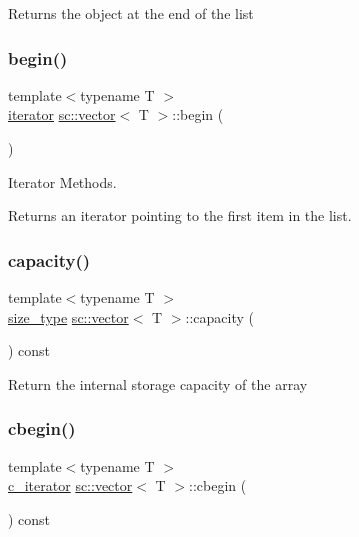 Returns the object at the end of the list \mbox{\label{classsc_1_1vector_aefba74791ea0f1ab9b9ad95d35bf9497}} 
\subsubsection{\texorpdfstring{begin()}{begin()}}
{\footnotesize\ttfamily template$<$typename T $>$ \\
\hyperlink{classsc_1_1vector_1_1iterator}{iterator} \hyperlink{classsc_1_1vector}{sc\+::vector}$<$ T $>$\+::begin (\begin{DoxyParamCaption}{ }\end{DoxyParamCaption})\hspace{0.3cm}{\ttfamily [inline]}}



Iterator Methods. 

Returns an iterator pointing to the first item in the list. \mbox{\label{classsc_1_1vector_a318c4ab34bd9605214e99db94c4258a9}} 
\subsubsection{\texorpdfstring{capacity()}{capacity()}}
{\footnotesize\ttfamily template$<$typename T $>$ \\
\hyperlink{classsc_1_1vector_a48bf37ba1a6d0c13504414d86e27c399}{size\+\_\+type} \hyperlink{classsc_1_1vector}{sc\+::vector}$<$ T $>$\+::capacity (\begin{DoxyParamCaption}{ }\end{DoxyParamCaption}) const\hspace{0.3cm}{\ttfamily [inline]}}

Return the internal storage capacity of the array \mbox{\label{classsc_1_1vector_aa9ef5584dc8f0d021f3689b1b617607d}} 
\subsubsection{\texorpdfstring{cbegin()}{cbegin()}}
{\footnotesize\ttfamily template$<$typename T $>$ \\
\hyperlink{classsc_1_1vector_1_1c__iterator}{c\+\_\+iterator} \hyperlink{classsc_1_1vector}{sc\+::vector}$<$ T $>$\+::cbegin (\begin{DoxyParamCaption}{ }\end{DoxyParamCaption}) const\hspace{0.3cm}{\ttfamily [inline]}}




